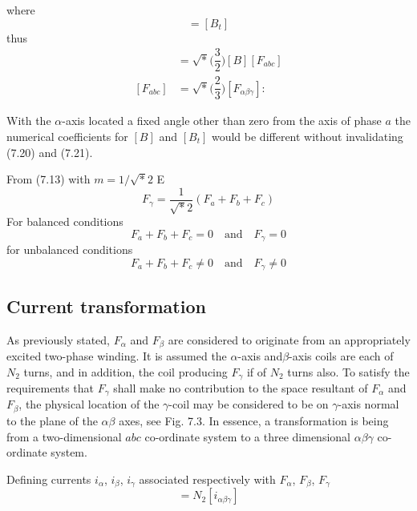 \documentclass[a4paper,numbers=noenddot,12pt]{scrbook}
\begin{document}
    where
    \begin{equation}
        [B^{-1}] = [B_t]
        \label{eq:Eq7.19}
    \end{equation}
    thus
    \begin{align}
        [F_{\alpha \beta \gamma}]  & = \sqrt*{\Big(\dfrac{3}{2}\Big)}  [B] [F_{abc}] \\
        [F_{abc}]  & =  \sqrt*{\Big(\dfrac{2}{3}\Big)} [F_{\alpha \beta \gamma}]
        \label{eq:Eq7.21}:
    \end{align}

    With the $\alpha$-axis located a fixed angle other than zero from the axis of phase $a$ the numerical coefficients for $[B]$ and $[B_t]$ would be different without invalidating (7.20) and (7.21).

    From (7.13) with $m = 1 / \sqrt*{2}$
    E\begin{equation}
        F_{\gamma} = \dfrac{1}{\sqrt*{2}}(F_a + F_b + F_c)
        \label{eq:Eq7.22}
    \end{equation}
    For balanced conditions
    \begin{equation*}
        F_a + F_b + F_c = 0 \quad \text{and} \quad F_{\gamma} = 0
    \end{equation*}
    for unbalanced conditions
    \begin{equation*}
        F_a + F_b + F_c \neq 0 \quad \text{and} \quad F_{\gamma} \neq 0
    \end{equation*}

    \subsection{Current transformation} As previously stated, $F_{\alpha}$ and $F_{\beta}$ are considered to originate from an appropriately excited two-phase winding. It is assumed the $\alpha$-axis and$\beta$-axis coils are each of $N_2$ turns, and in addition, the coil producing $F_{\gamma}$ if of $N_2$ turns also. To satisfy the requirements that $F_{\gamma}$ shall make no contribution to the space resultant of $F_{\alpha}$ and $F_{\beta}$, the physical location of the
    $\gamma$-coil may be considered to be on $\gamma$-axis normal to the plane of the $\alpha \beta$ axes, see Fig. 7.3. In essence, a transformation is being from a two-dimensional $abc$ co-ordinate system to a three dimensional $\alpha \beta \gamma$ co-ordinate system.

    Defining currents $i_{\alpha}$, $i_{\beta}$, $i_{\gamma}$ associated respectively with $F_{\alpha}$, $F_{\beta}$, $F_{\gamma}$
    \begin{equation}
        [F_{\alpha \beta \gamma}] = N_2 [i_{\alpha \beta \gamma}]
        \label{eq:Eq7.23}
    \end{equation}
\end{document}
